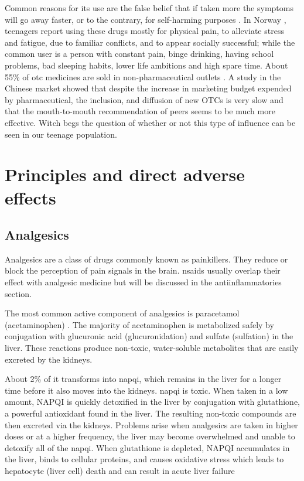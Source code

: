 Common reasons for its use are the false belief that if taken more the symptoms will go away faster, or to the contrary, for self-harming purposes \cite{Algarni2021}. In Norway \cite{Lorentzen2018}, teenagers report using these drugs mostly for physical pain, to alleviate stress and fatigue, due to familiar conflicts, and to appear socially successful; while the common user is a person with constant pain, binge drinking, having school problems, bad sleeping habits, lower life ambitions and high spare time. About 55\% of \gls{otc} medicines are sold in non-pharmaceutical outlets \cite{Lorentzen2018}. A study in the Chinese market \cite{Qian2020} showed that despite the increase in marketing budget expended by pharmaceutical, the inclusion, and diffusion of new OTCs is very slow and that the mouth-to-mouth recommendation of peers seems to be much more effective. Witch begs the question of whether or not this type of influence can be seen in our teenage population.


\section{Principles and direct adverse effects}

\subsection{Analgesics}

Analgesics are a class of drugs commonly known as painkillers. They reduce or block the perception of pain signals in the brain. \gls{nsaids} usually overlap their effect with analgesic medicine but will be discussed in the antiinflammatories section.

The most common active component of analgesics is paracetamol (acetaminophen) \cite{Brune2014}. The majority of acetaminophen is metabolized safely by conjugation with glucuronic acid (glucuronidation) and sulfate (sulfation) in the liver. These reactions produce non-toxic, water-soluble metabolites that are easily excreted by the kidneys.

About 2\% of it transforms into \gls{napqi}, which remains in the liver for a longer time before it also moves into the kidneys. \gls{napqi} is toxic. When taken in a low amount, NAPQI is quickly detoxified in the liver by conjugation with glutathione, a powerful antioxidant found in the liver. The resulting non-toxic compounds are then excreted via the kidneys. Problems arise when analgesics are taken in higher doses or at a higher frequency, the liver may become overwhelmed and unable to detoxify all of the \gls{napqi}. When glutathione is depleted, NAPQI accumulates in the liver, binds to cellular proteins, and causes oxidative stress which leads to hepatocyte (liver cell) death and can result in acute liver failure

